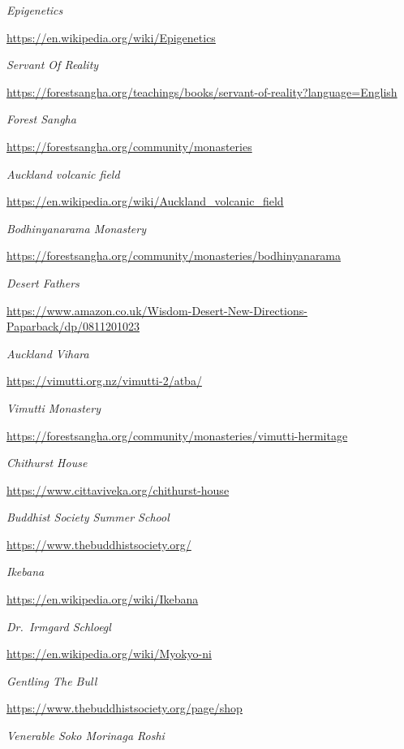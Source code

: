 \begin{thebibliography}{9}
 \emph{Epigenetics}

  {\urlsize \url{https://en.wikipedia.org/wiki/Epigenetics}}

 \emph{Servant Of Reality}

  {\urlsize \url{https://forestsangha.org/teachings/books/servant-of-reality?language=English}}

 \emph{Forest Sangha}

  {\urlsize \url{https://forestsangha.org/community/monasteries}}

 \emph{Auckland volcanic field}

  {\urlsize \url{https://en.wikipedia.org/wiki/Auckland_volcanic_field}}

 \emph{Bodhinyanarama Monastery}

  {\urlsize \url{https://forestsangha.org/community/monasteries/bodhinyanarama}}

 \emph{Desert Fathers}

  {\urlsize \url{https://www.amazon.co.uk/Wisdom-Desert-New-Directions-Paparback/dp/0811201023}}

 \emph{Auckland Vihara}

  {\urlsize \url{https://vimutti.org.nz/vimutti-2/atba/}}

 \emph{Vimutti Monastery}

  {\urlsize \url{https://forestsangha.org/community/monasteries/vimutti-hermitage}}

 \emph{Chithurst House}

  {\urlsize \url{https://www.cittaviveka.org/chithurst-house}}

 \emph{Buddhist Society Summer School}

  {\urlsize \url{https://www.thebuddhistsociety.org/}}

 \emph{Ikebana}

  {\urlsize \url{https://en.wikipedia.org/wiki/Ikebana}}

 \emph{Dr.~Irmgard Schloegl}

  {\urlsize \url{https://en.wikipedia.org/wiki/Myokyo-ni}}

 \emph{Gentling The Bull}

  {\urlsize \url{https://www.thebuddhistsociety.org/page/shop}}

 \emph{Venerable Soko Morinaga Roshi}


\end{thebibliography}
